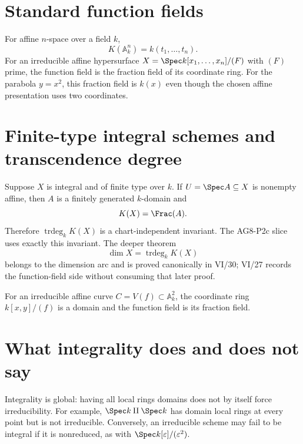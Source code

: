 

\section{Standard function fields}
For affine $n$-space over a field $k$,
\[
K(\mathbb A^n_k)=k(t_1,\dots,t_n).
\]
For an irreducible affine hypersurface $X=\Spec k[x_1,\dots,x_n]/(F)$ with $(F)$ prime, the function field is the
fraction field of its coordinate ring.  For the parabola $y=x^2$, this fraction field is $k(x)$ even though the
chosen affine presentation uses two coordinates.



\section{Finite-type integral schemes and transcendence degree}
Suppose $X$ is integral and of finite type over $k$.  If $U=\Spec A\subseteq X$ is nonempty affine, then $A$ is a
finitely generated $k$-domain and
\[
K(X)=\Frac(A).
\]
Therefore $\operatorname{trdeg}_kK(X)$ is a chart-independent invariant.  The AG8-P2c slice uses exactly
this invariant.  The deeper theorem
\[
\dim X=\operatorname{trdeg}_kK(X)
\]
belongs to the dimension arc and is proved canonically in VI/30; VI/27 records the function-field side without
consuming that later proof.



\begin{example}\label{ex:vi27-expand-03}
For an irreducible affine curve $C=V(f)\subset\mathbb A^2_k$, the coordinate ring $k[x,y]/(f)$ is a domain and the function field is its fraction field.
\end{example}
\section{What integrality does and does not say}
Integrality is global: having all local rings domains does not by itself force irreducibility.  For example,
$\Spec k\amalg\Spec k$ has domain local rings at every point but is not irreducible.  Conversely, an irreducible
scheme may fail to be integral if it is nonreduced, as with $\Spec k[\varepsilon]/(\varepsilon^2)$.

